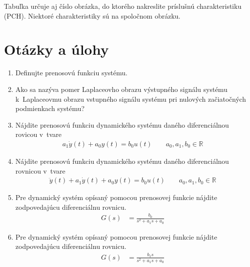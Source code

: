 \documentclass[a4paper, 10pt, ]{article}
\begin{document}
\medskip

\noindent
Tabuľka určuje aj číslo obrázka, do ktorého nakreslite príslušnú charakteristiku (PCH). Niektoré charakteristiky sú na spoločnom obrázku.

















\section{Otázky a úlohy}


\begin{enumerate}[leftmargin=0pt, labelsep=3mm, itemsep=0pt]

    \item Definujte prenosovú funkciu systému.

    \item Ako sa nazýva pomer Laplaceovho obrazu výstupného signálu systému k~Laplaceovmu obrazu vstupného signálu systému pri nulových začiatočných podmienkach systému?





    \item Nájdite prenosovú funkciu dynamického systému daného diferenciálnou rovicou v~tvare
    \begin{align*}
        a_1 \dot y(t) + a_0 y(t) = b_0 u(t) \qquad a_0, a_1, b_0\in\mathbb R
    \end{align*}

    \item Nájdite prenosovú funkciu dynamického systému daného diferenciálnou rovnicou v~tvare
    \begin{align*}
        \ddot y(t) + a_1 \dot y(t) + a_0 y(t) = b_0 u(t) \qquad a_0, a_1, b_0\in\mathbb R
    \end{align*}



    \item Pre dynamický systém opísaný pomocou prenosovej funkcie nájdite zodpovedajúcu diferenciálnu rovnicu.
    \begin{align*}
        G(s) &= \frac{b_0}{s^2 + a_1 s + a_0}
    \end{align*}


    \item Pre dynamický systém opísaný pomocou prenosovej funkcie nájdite zodpovedajúcu diferenciálnu rovnicu.
    \begin{align*}
        G(s) &= \frac{b_1 s}{s^2 + a_1 s + a_0}
    \end{align*}


\end{enumerate}
\end{document}
